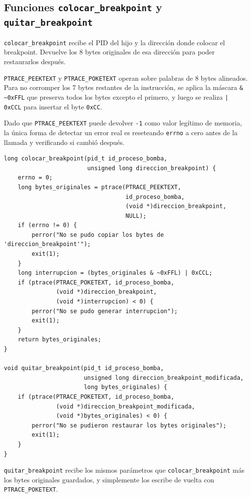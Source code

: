 \documentclass[10pt,a4paper]{article}
\begin{document}
\subsection{Funciones \texttt{colocar\_breakpoint} y \texttt{quitar\_breakpoint}}

\texttt{colocar\_breakpoint} recibe el PID del hijo y la dirección donde colocar el breakpoint. Devuelve los 8 bytes originales de esa dirección para poder restaurarlos después.

\texttt{PTRACE\_PEEKTEXT} y \texttt{PTRACE\_POKETEXT} operan sobre palabras de 8 bytes alineados. Para no corromper los 7 bytes restantes de la instrucción, se aplica la máscara \texttt{\& \textasciitilde0xFFL} que preserva todos los bytes excepto el primero, y luego se realiza \texttt{| 0xCCL} para insertar el byte \texttt{0xCC}.

Dado que \texttt{PTRACE\_PEEKTEXT} puede devolver \texttt{-1} como valor legítimo de memoria, la única forma de detectar un error real es reseteando \texttt{errno} a cero antes de la llamada y verificando si cambió después.

\begin{lstlisting}[style=cstyle, caption={Funciones colocar\_breakpoint y quitar\_breakpoint}]
long colocar_breakpoint(pid_t id_proceso_bomba,
                        unsigned long direccion_breakpoint) {
    errno = 0;
    long bytes_originales = ptrace(PTRACE_PEEKTEXT,
                                   id_proceso_bomba,
                                   (void *)direccion_breakpoint,
                                   NULL);
    if (errno != 0) {
        perror("No se pudo copiar los bytes de 'direccion_breakpoint'");
        exit(1);
    }
    long interrupcion = (bytes_originales & ~0xFFL) | 0xCCL;
    if (ptrace(PTRACE_POKETEXT, id_proceso_bomba,
               (void *)direccion_breakpoint,
               (void *)interrupcion) < 0) {
        perror("No se pudo generar interrupcion");
        exit(1);
    }
    return bytes_originales;
}

void quitar_breakpoint(pid_t id_proceso_bomba,
                       unsigned long direccion_breakpoint_modificada,
                       long bytes_originales) {
    if (ptrace(PTRACE_POKETEXT, id_proceso_bomba,
               (void *)direccion_breakpoint_modificada,
               (void *)bytes_originales) < 0) {
        perror("No se pudieron restaurar los bytes originales");
        exit(1);
    }
}
\end{lstlisting}

\texttt{quitar\_breakpoint} recibe los mismos parámetros que \texttt{colocar\_breakpoint} más los bytes originales guardados, y simplemente los escribe de vuelta con \texttt{PTRACE\_POKETEXT}.
\end{document}
